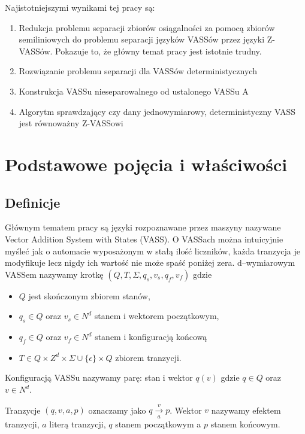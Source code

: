     Najistotniejszymi wynikami tej pracy są:
    \begin{enumerate}
        \item Redukcja problemu separacji zbiorów osiągalności za pomocą zbiorów semiliniowych do problemu separacji języków VASSów przez języki Z-VASSów.
        Pokazuje to, że główny temat pracy jest istotnie trudny.
        \item Rozwiązanie problemu separacji dla VASSów deterministycznych
        \item Konstrukcja VASSu nieseparowalnego od ustalonego VASSu A
        \item Algorytm sprawdzający czy dany jednowymiarowy, deterministyczny VASS jest równoważny Z-VASSowi
    \end{enumerate}


    \chapter{Podstawowe pojęcia i właściwości}\label{r:pojecia}


    \section{Definicje}
    Głównym tematem pracy są języki rozpoznawane przez maszyny nazywane Vector Addition System with States (VASS).
    O VASSach można intuicyjnie myśleć jak o automacie wyposażonym w stałą ilość liczników, każda tranzycja je modyfikuje
    lecz nigdy ich wartość nie może spaść poniżej zera.
    d--wymiarowym VASSem nazywamy krotkę $(Q,T,\Sigma,q_s,v_s,q_f,v_f)$ gdzie
    \begin{itemize}
        \item     $Q$ jest skończonym zbiorem stanów,
        \item     $q_s \in Q$ oraz $v_s \in N^d$ stanem i wektorem początkowym,
        \item     $q_f \in Q$ oraz $v_f \in N^d$ stanem i konfiguracją końcową
        \item      $T \in Q \times Z^d \times \Sigma \cup \{\epsilon\} \times Q$ zbiorem tranzycji.
    \end{itemize}
    Konfiguracją VASSu nazywamy parę: stan i wektor $q(v)$ gdzie $q \in Q$ oraz  $v \in N^d$.


    Tranzycje $(q,v,a,p)$ oznaczamy jako $q \xrightarrow[a]{v} p $.
    Wektor $v$ nazywamy efektem tranzycji, $a$ literą tranzycji, $q$ stanem początkowym a $p$ stanem końcowym.


